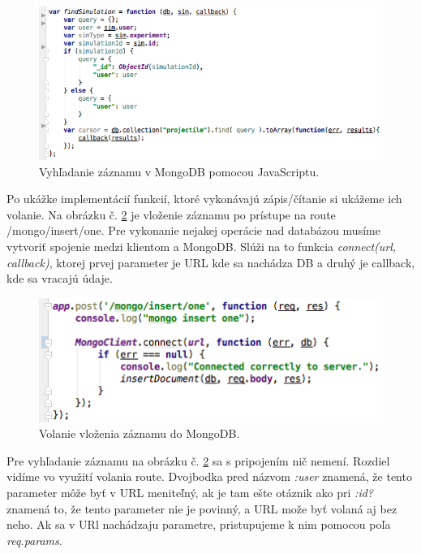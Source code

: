\begin{figure}[H]
  \centering
  \includegraphics[scale=0.7]{img/code/express-mongodb-find.png}
  \caption{Vyhľadanie záznamu v MongoDB pomocou JavaScriptu.}
  \label{img-express-mongodb-find}
\end{figure}

Po ukážke implementácií funkcií, ktoré vykonávajú zápis/čítanie si ukážeme ich volanie. Na obrázku č. \ref{img-express-mongodb-insert2} je vloženie záznamu po prístupe na route /mongo/insert/one. Pre vykonanie nejakej operácie nad databázou musíme vytvoriť spojenie medzi klientom a MongoDB. Slúži na to funkcia \textit{connect(url, callback)}, ktorej prvej parameter je URL kde sa nachádza DB a druhý je callback, kde sa vracajú údaje.

\begin{figure}[H]
  \centering
  \includegraphics[scale=0.7]{img/code/express-mongo-insert2.png}
  \caption{Volanie vloženia záznamu do MongoDB.}
  \label{img-express-mongodb-insert2}
\end{figure}

Pre vyhľadanie záznamu na obrázku č. \ref{img-express-mongodb-insert2} sa s pripojením nič nemení. Rozdiel vidíme vo využití volania route. Dvojbodka pred názvom \textit{:user} znamená, že tento parameter môže byť v URL meniteľný, ak je tam ešte otáznik ako pri \textit{:id?} znamená to, že tento parameter nie je povinný, a URL može byť volaná aj bez neho. Ak sa v URl nachádzaju parametre, pristupujeme k nim pomocou poľa \textit{req.params}.

